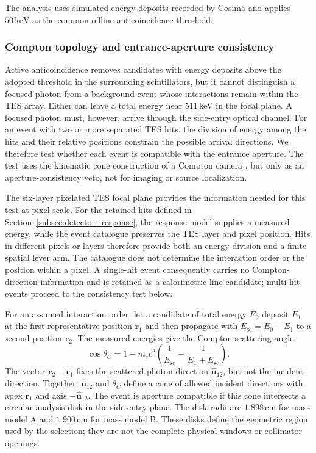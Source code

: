 \documentclass[11pt]{article}
\newcommand{\keV}{\ensuremath{\,\mathrm{keV}}}
\begin{document}
The analysis uses simulated energy deposits recorded by Cosima and applies
$50\keV$ as the common offline anticoincidence threshold.

\subsubsection{Compton topology and entrance-aperture consistency}

Active anticoincidence removes candidates with energy deposits above the adopted
threshold in the surrounding scintillators, but it cannot distinguish a focused photon from a
background event whose interactions remain within the TES array. Either can
leave a total energy near 511\,keV in the focal plane. A focused photon must,
however, arrive through the side-entry optical channel. For an event with two
or more separated TES hits, the division of energy among the hits and their
relative positions constrain the possible arrival directions. We therefore test
whether each event is compatible with the entrance aperture. The test uses the
kinematic cone construction of a Compton camera
\cite{Zoglauer2006}, but only as an aperture-consistency veto, not for imaging
or source localization.

The six-layer pixelated TES focal plane provides the information needed for
this test at pixel scale. For the retained hits defined in
Section~\ref{subsec:detector_response}, the response model supplies a measured
energy, while the event catalogue preserves the TES layer and pixel position.
Hits in different pixels or layers therefore provide both an energy division
and a finite spatial lever arm. The catalogue does not determine the interaction
order or the position within a pixel. A single-hit event consequently carries
no Compton-direction information and is retained as a calorimetric line
candidate; multi-hit events proceed to the consistency test below.

For an assumed interaction order, let a candidate of total energy $E_0$ deposit
$E_1$ at the first representative position $\mathbf r_1$ and then propagate
with $E_{\mathrm{sc}}=E_0-E_1$ to a second position $\mathbf r_2$. The measured
energies give the Compton scattering angle
\begin{equation}
  \cos\theta_C =
  1 - m_ec^2\left(\frac{1}{E_{\mathrm{sc}}}
  - \frac{1}{E_1+E_{\mathrm{sc}}}\right).
\end{equation}
The vector $\mathbf r_2-\mathbf r_1$ fixes the scattered-photon direction
$\hat{\mathbf u}_{12}$, but not the incident direction. Together,
$\hat{\mathbf u}_{12}$ and $\theta_C$ define a cone of allowed incident
directions with apex $\mathbf r_1$ and axis $-\hat{\mathbf u}_{12}$. The event
is aperture compatible if this cone intersects a circular analysis disk in the
side-entry plane. The disk radii are $1.898\,\mathrm{cm}$ for mass model A and
$1.900\,\mathrm{cm}$ for mass model B. These disks define the geometric region
used by the selection; they are not the complete physical windows or collimator
openings.
\end{document}
